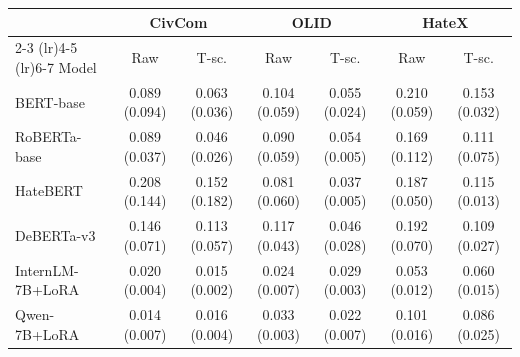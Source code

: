 \begin{tabular}{lcccccc}
\toprule
 & \multicolumn{2}{c}{CivCom} & \multicolumn{2}{c}{OLID} & \multicolumn{2}{c}{HateX} \\
\cmidrule(lr){2-3} \cmidrule(lr){4-5} \cmidrule(lr){6-7}
Model & Raw & T-sc. & Raw & T-sc. & Raw & T-sc. \\
\midrule
BERT-base & 0.089 (0.094) & 0.063 (0.036) & 0.104 (0.059) & 0.055 (0.024) & 0.210 (0.059) & 0.153 (0.032) \\
RoBERTa-base & 0.089 (0.037) & 0.046 (0.026) & 0.090 (0.059) & 0.054 (0.005) & 0.169 (0.112) & 0.111 (0.075) \\
HateBERT & 0.208 (0.144) & 0.152 (0.182) & 0.081 (0.060) & 0.037 (0.005) & 0.187 (0.050) & 0.115 (0.013) \\
DeBERTa-v3 & 0.146 (0.071) & 0.113 (0.057) & 0.117 (0.043) & 0.046 (0.028) & 0.192 (0.070) & 0.109 (0.027) \\
InternLM-7B+LoRA & 0.020 (0.004) & 0.015 (0.002) & 0.024 (0.007) & 0.029 (0.003) & 0.053 (0.012) & 0.060 (0.015) \\
Qwen-7B+LoRA & 0.014 (0.007) & 0.016 (0.004) & 0.033 (0.003) & 0.022 (0.007) & 0.101 (0.016) & 0.086 (0.025) \\
\bottomrule
\end{tabular}
